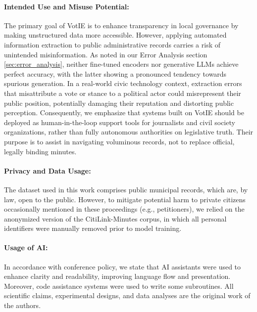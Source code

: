 \documentclass[11pt]{article}
\begin{document}
\paragraph{Intended Use and Misuse Potential:} The primary goal of VotIE is to enhance transparency in local governance by making unstructured data more accessible. However, applying automated information extraction to public administrative records carries a risk of unintended misinformation. As noted in our Error Analysis section \ref{sec:error_analysis}, neither fine-tuned encoders nor generative LLMs achieve perfect accuracy, with the latter showing a pronounced tendency towards spurious generation. In a real-world civic technology context, extraction errors that misattribute a vote or stance to a political actor could misrepresent their public position, potentially damaging their reputation and distorting public perception. Consequently, we emphasize that systems built on VotIE should be deployed as human-in-the-loop support tools for journalists and civil society organizations, rather than fully autonomous authorities on legislative truth. Their purpose is to assist in navigating voluminous records, not to replace official, legally binding minutes.

\paragraph{Privacy and Data Usage:} The dataset used in this work comprises public municipal records, which are, by law, open to the public. However, to mitigate potential harm to private citizens occasionally mentioned in these proceedings (e.g., petitioners), we relied on the anonymized version of the CitiLink-Minutes corpus, in which all personal identifiers were manually removed prior to model training.

\paragraph{Usage of AI:} In accordance with conference policy, we state that AI assistants were used to enhance clarity and readability, improving language flow and presentation. Moreover, code assistance systems were used to write some subroutines. All scientific claims, experimental designs, and data analyses are the original work of the authors.


\appendix

\end{document}
